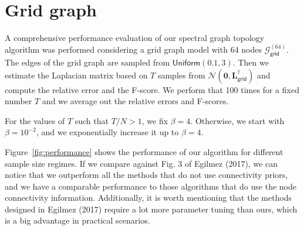 \documentclass{article}
\begin{document}
\section{Grid graph}
A comprehensive performance evaluation of our spectral graph topology algorithm was
performed considering a grid graph model with 64 nodes $\mathcal{G}^{(64)}_{\mathsf{grid}}$.
The edges of the grid graph are sampled from $\mathsf{Uniform}(0.1, 3)$.
Then we estimate the Laplacian matrix based on $T$ samples from $\mathcal{N}(\mathbf{0}, \mathbf{L}_{\mathsf{grid}}^{\dagger})$
and compute the relative error and the F-score. We perform that 100 times for a fixed number $T$ and we average out the relative errors
and F-scores.

For the values of $T$ such that $T / N > 1$, we fix $\beta = 4$. Otherwise, we start with $\beta = 10^{-2}$, and we exponentially
increase it up to $\beta = 4$.

Figure~\ref{fig:performance} shows the performance of our algorithm for different sample size regimes.
If we compare against Fig. 3 of Egilmez (2017), we can notice that we outperform all the methods that
do not use connectivity priors, and we have a comparable performance to those algorithms that
do use the node connectivity information. Additionally, it is worth mentioning that the methods
designed in Egilmez (2017) require a lot more parameter tuning than ours, which is a big advantage in 
practical scenarios.
\end{document}
